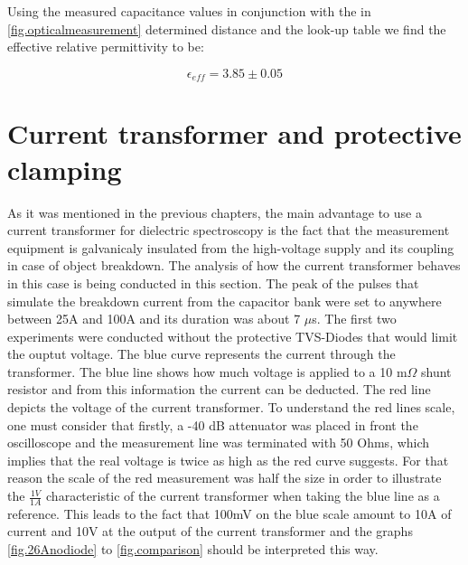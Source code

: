 Using the measured capacitance values in conjunction with the in \ref{fig.opticalmeasurement} determined distance and the look-up table
we find the effective relative permittivity to be:

\begin{equation}
 \epsilon_{eff}=3.85 \pm 0.05
\end{equation}


\section{Current transformer and protective clamping} 
As it was mentioned in the previous chapters, the main advantage to use a current transformer for
dielectric spectroscopy is the fact that the measurement equipment is galvanicaly insulated from the high-voltage supply and its
coupling in case of object breakdown. The analysis of how the current transformer behaves in this case is being conducted in this section.
The peak of the pulses that simulate the breakdown current from the capacitor bank were set to anywhere between 25A and 100A and its duration was about 7 $\mu$s.
The first two experiments were conducted without the protective TVS-Diodes that would limit the ouptut voltage.
The blue curve represents the current through the transformer. The blue line shows how much voltage is applied to a 10 m$\Omega$ shunt resistor and from this information the current can
be deducted. The red line depicts the voltage of the current transformer. To understand the red lines scale, one must consider that firstly, a -40 dB attenuator was placed in front the
oscilloscope and the measurement line was terminated with 50 Ohms, which implies that the real voltage is twice as high as the red curve suggests. For that reason the scale of the red measurement was half the size in order to illustrate the
$\frac{1V}{1A}$ characteristic of the current transformer when taking the blue line as a reference.
\newline 
This leads to the fact that 100mV on the blue scale amount to 10A of current and 10V at the output of the current transformer and the graphs \ref{fig.26Anodiode} to \ref{fig.comparison} should be interpreted
this way.



